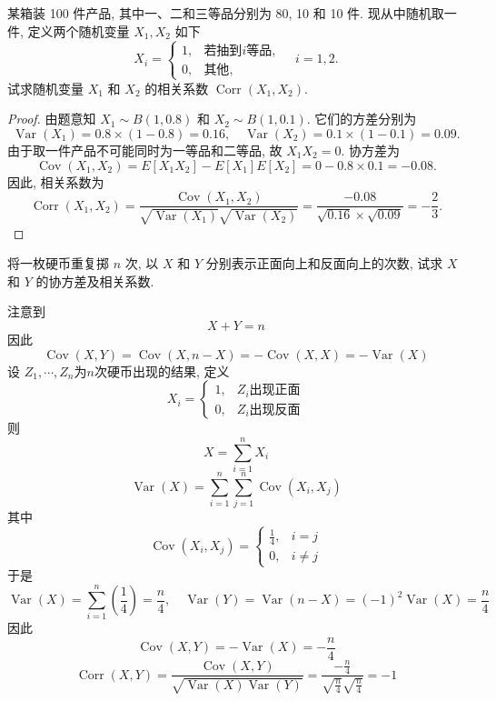 \documentclass[../main.tex]{subfiles}
\begin{document}
\begin{exercise}{}{}
某箱装 100 件产品, 其中一、二和三等品分别为 80, 10 和 10 件. 现从中随机取一件, 定义两个随机变量 \(X_1,X_2\) 如下
\[
X_i=
\begin{cases}
1, & \text{若抽到}i\text{等品},\\
0, & \text{其他},
\end{cases}
\quad i=1,2.
\]
试求随机变量 \(X_1\) 和 \(X_2\) 的相关系数 \(\operatorname{Corr}(X_1,X_2)\).
\end{exercise}
\begin{proof}
    
由题意知 \(X_1 \sim B(1, 0.8)\) 和 \(X_2 \sim B(1, 0.1)\). 它们的方差分别为
\[
\operatorname{Var}(X_1) = 0.8 \times (1-0.8) = 0.16, \quad \operatorname{Var}(X_2) = 0.1 \times (1-0.1) = 0.09.
\]
由于取一件产品不可能同时为一等品和二等品, 故 \(X_1 X_2 = 0\). 协方差为
\[
\operatorname{Cov}(X_1, X_2) = E[X_1 X_2] - E[X_1]E[X_2] = 0 - 0.8 \times 0.1 = -0.08.
\]
因此, 相关系数为
\[
\operatorname{Corr}(X_1, X_2) = \frac{\operatorname{Cov}(X_1, X_2)}{\sqrt{\operatorname{Var}(X_1)}\sqrt{\operatorname{Var}(X_2)}} = \frac{-0.08}{\sqrt{0.16} \times \sqrt{0.09}} = -\frac{2}{3}.
\]
\end{proof}
\begin{exercise}{}{}
将一枚硬币重复掷 \(n\) 次, 以 \(X\) 和 \(Y\) 分别表示正面向上和反面向上的次数, 试求 \(X\) 和 \(Y\) 的协方差及相关系数.
\end{exercise}
\begin{solution}
    注意到 \[
    X+ Y= n
    \]因此 \[
    \operatorname{Cov}\left( X,Y \right)= \operatorname{Cov}\left( X,n-X \right)=  - \operatorname{Cov}\left( X,X \right)= - \operatorname{Var}\left( X \right)    
    \]
    设 \(  Z_1,\cdots ,Z_{n}  \)为\(  n  \)次硬币出现的结果, 定义 \[
    X_{i}= \begin{cases} 1,& Z_{i}\text{出现正面}\\ 
     0,& Z_{i}\text{出现反面} \end{cases} 
    \]  则 \[
    X= \sum _{i= 1}^{n}X_{i}
    \]\[
    \operatorname{Var}\left( X \right)= \sum _{i= 1}^{n}\sum _{j= 1}^{n}\operatorname{Cov}\left( X_i, X_{j} \right)  
    \]其中 \[
    \operatorname{Cov}\left( X_{i},X_{j} \right)= \begin{cases} \frac{1}{4},&i= j\\ 
     0,& i \neq j \end{cases}  
    \]于是 \[
    \operatorname{Var}\left( X \right) = \sum _{i= 1}^{n}\left( \frac{1}{4} \right)= \frac{n}{4} ,\quad \operatorname{Var}\left( Y \right)= \operatorname{Var}\left( n-X \right)= \left( -1 \right)^{2}\operatorname{Var}\left( X \right)= \frac{n}{4}    
    \]因此 \[
    \operatorname{Cov}\left( X,Y \right)= -\operatorname{Var}\left( X \right)= -\frac{n}{4}  
    \] \[
    \operatorname{Corr}\left( X,Y \right)= \frac{\operatorname{Cov}\left( X,Y \right)  }{\sqrt{\operatorname{Var}\left( X \right)\operatorname{Var}\left( Y \right)  } }= \frac{-\frac{n}{4} }{\sqrt{\frac{n}{4}}\sqrt{\frac{n}{4}} }= -1   
    \] 
\end{solution}
\end{document}
